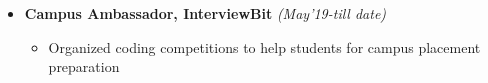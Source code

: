 \documentclass[a4paper,10pt]{article}
\begin{document}
\begin{itemize}[noitemsep,nolistsep]
\vspace{0.15cm}
    \item \textbf{Campus Ambassador, InterviewBit}
    \hfill\emph{(May'19-till date)}\\[-0.4cm]
        \begin{itemize}[noitemsep,nolistsep]
           \item Organized coding competitions to help students for campus placement preparation
        \end{itemize}
        
        
        
\end{itemize} 
\vspace{0.2cm}
\end{document}
